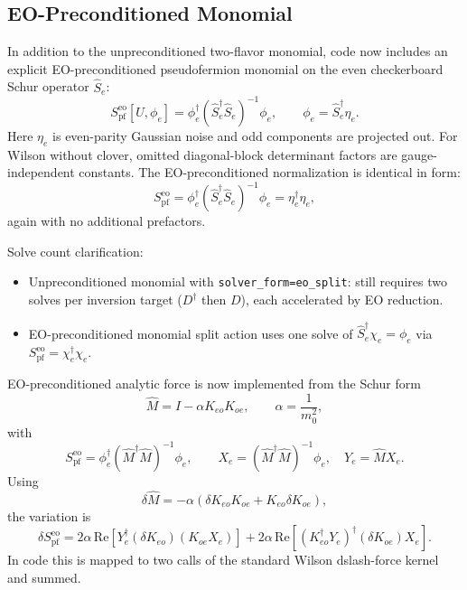 \documentclass[11pt]{article}
\begin{document}
\subsection{EO-Preconditioned Monomial}
In addition to the unpreconditioned two-flavor monomial, code now includes an explicit
EO-preconditioned pseudofermion monomial on the even checkerboard Schur operator
$\hat S_e$:
\begin{equation}
S_{\mathrm{pf}}^{\mathrm{eo}}[U,\phi_e]
=
\phi_e^\dagger \left(\hat S_e^\dagger \hat S_e\right)^{-1}\phi_e,
\qquad
\phi_e = \hat S_e^\dagger \eta_e.
\end{equation}
Here $\eta_e$ is even-parity Gaussian noise and odd components are projected out.
For Wilson without clover, omitted diagonal-block determinant factors are gauge-independent constants.
The EO-preconditioned normalization is identical in form:
\begin{equation}
S_{\mathrm{pf}}^{\mathrm{eo}} = \phi_e^\dagger (\hat S_e^\dagger \hat S_e)^{-1}\phi_e
= \eta_e^\dagger \eta_e,
\end{equation}
again with no additional prefactors.

Solve count clarification:
\begin{itemize}
  \item Unpreconditioned monomial with \texttt{solver\_form=eo\_split}: still requires two solves per inversion target ($D^\dagger$ then $D$), each accelerated by EO reduction.
  \item EO-preconditioned monomial split action uses one solve of $\hat S_e^\dagger \chi_e=\phi_e$ via
  $S_{\mathrm{pf}}^{\mathrm{eo}}=\chi_e^\dagger\chi_e$.
\end{itemize}

EO-preconditioned analytic force is now implemented from the Schur form
\begin{equation}
\hat M = I - \alpha K_{eo}K_{oe},\qquad \alpha=\frac{1}{m_0^2},
\end{equation}
with
\begin{equation}
S_{\mathrm{pf}}^{\mathrm{eo}} = \phi_e^\dagger (\hat M^\dagger \hat M)^{-1}\phi_e,
\qquad
X_e=(\hat M^\dagger \hat M)^{-1}\phi_e,\quad
Y_e=\hat M X_e.
\end{equation}
Using
\begin{equation}
\delta \hat M = -\alpha\left(\delta K_{eo}K_{oe}+K_{eo}\delta K_{oe}\right),
\end{equation}
the variation is
\begin{equation}
\delta S_{\mathrm{pf}}^{\mathrm{eo}}
=
2\alpha\,\mathrm{Re}\!\left[Y_e^\dagger (\delta K_{eo})(K_{oe}X_e)\right]
+
2\alpha\,\mathrm{Re}\!\left[(K_{eo}^\dagger Y_e)^\dagger (\delta K_{oe})X_e\right].
\end{equation}
In code this is mapped to two calls of the standard Wilson dslash-force kernel and summed.
\end{document}
